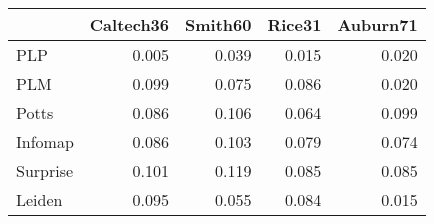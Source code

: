 \begin{tabular}{lrrrr}
\toprule
{} & Caltech36 & Smith60 & Rice31 & Auburn71 \\
\midrule
PLP      &     0.005 &   0.039 &  0.015 &    0.020 \\
PLM      &     0.099 &   0.075 &  0.086 &    0.020 \\
Potts    &     0.086 &   0.106 &  0.064 &    0.099 \\
Infomap  &     0.086 &   0.103 &  0.079 &    0.074 \\
Surprise &     0.101 &   0.119 &  0.085 &    0.085 \\
Leiden   &     0.095 &   0.055 &  0.084 &    0.015 \\
\bottomrule
\end{tabular}
